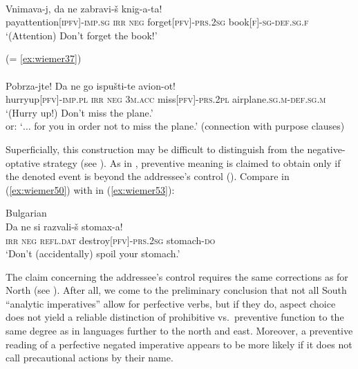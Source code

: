 \documentclass[output=paper,colorlinks,citecolor=brown]{langscibook}
\begin{document}
\ea \textnormal{}\\
\label{ex:wiemer51} 
\gll {\op}Vnimava-j,{\cp} da ne zabravi-š knig-a-ta!\\
pay\textunderscore attention\textsc{[ipfv]-imp.sg} \textsc{irr} \textsc{neg} forget\textsc{[pfv]-prs.2sg} book\textsc{[f]-sg-def.sg.f}\\
\glt `(Attention) Don't forget the book!'
\z

\ea 
\label{ex:wiemer52} \textnormal{(= \ref{ex:wiemer37})} \\
 \\
 \gll {\op}Pobrza-jte!{\cp} Da ne go ispušti-te avion-ot! \\
hurry\textunderscore up\textsc{[pfv]-imp.pl} \textsc{irr} \textsc{neg} \textsc{3m.acc} miss\textsc{[pfv]-prs.2pl} airplane\textsc{.sg.m-def.sg.m} \\
\glt `(Hurry up!) Don't miss the plane.' \\
or: `$\ldots$ for you in order not to miss the plane.' (connection with purpose clauses) \\
\z

\noindent Superficially, this construction may be difficult to distinguish from the negative-optative strategy (see ). As in , preventive meaning is claimed to obtain only if the denoted event is beyond the addressee's control (\citealt[41]{Cakarova2009}). Compare  in (\ref{ex:wiemer50}) with  in (\ref{ex:wiemer53}):

\ea \textnormal{Bulgarian} \\
\label{ex:wiemer53} 
\gll Da ne si razvali-š stomax-a! \\
\textsc{irr} \textsc{neg} \textsc{refl.dat} destroy\textsc{[pfv]-prs.2sg} stomach-\textsc{do} \\
\glt `Don't (accidentally) spoil your stomach.'
\z


\noindent The claim concerning the addressee's control requires the same corrections as for North  (see ). After all, we come to the preliminary conclusion that not all South  ``analytic imperatives'' allow for perfective verbs, but if they do, aspect choice does not yield a reliable distinction of prohibitive vs.\ preventive function to the same degree as in  languages further to the north and east. Moreover, a preventive reading of a perfective negated imperative appears to be more likely if it does not call precautional actions by their name.
\end{document}
